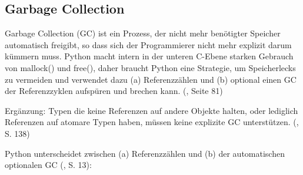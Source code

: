 \subsection{Garbage Collection}\label{sec:python_gc}


Garbage Collection (GC) ist ein Prozess, der nicht mehr benötigter Speicher
automatisch freigibt, so dass sich der Programmierer nicht mehr explizit
darum kümmern muss. Python macht intern in der unteren C-Ebene starken
Gebrauch von mallock() und free(), daher braucht Python eine Strategie, um
Speicherlecks zu vermeiden und verwendet dazu (a) Referenzzählen und (b)
optional einen GC der Referenzzyklen aufspüren und brechen kann. (\cite{pyref-reference}, Seite 81)

Ergänzung: Typen die keine Referenzen auf andere Objekte halten, oder
lediglich Referenzen auf atomare Typen haben, müssen keine explizite GC
unterstützen. (\cite{pyref-c-api}, S. 138)

Python unterscheidet zwischen (a) Referenzzählen und (b) der automatischen
optionalen GC (\cite{pyref-extending}, S. 13):


